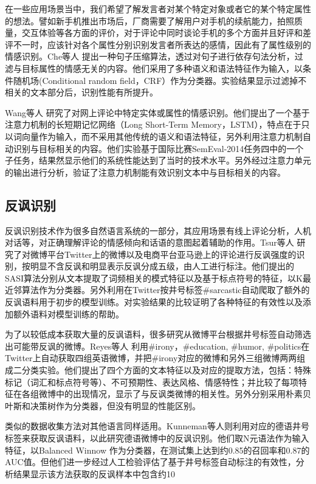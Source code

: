 在一些应用场景当中，我们希望了解发言者对某个特定对象或者它的某个特定属性的想法。譬如新手机推出市场后，厂商需要了解用户对手机的续航能力，拍照质量，交互体验等各方面的评价，对于评论中同时谈论手机的多个方面并且好评和差评不一时，应该针对各个属性分别识别发言者所表达的感情，因此有了属性级别的情感识别。Che等人 \cite{che2015sentence} 提出一种句子压缩算法，透过对句子进行依存句法分析，过滤与目标属性的情感无关的内容。他们采用了多种语义和语法特征作为输入，以条件随机场(Conditional random field，CRF）作为分类器。实验结果显示过滤掉不相关的文本部分后，识别性能有所提升。

Wang等人 \cite{wang2016attention}研究了对网上评论中特定实体或属性的情感识别。他们提出了一个基于注意力机制的长短期记忆网络（Long Short-Term Memory，LSTM），特点在于只以词向量作为输入，而不采用其他传统的语义和语法特征，另外利用注意力机制自动识别与目标相关的内容。他们实验基于国际比赛SemEval-2014任务四中的一个子任务，结果然显示他们的系统性能达到了当时的技术水平。另外经过注意力单元的输出进行分析，验证了注意力机制能有效识别文本中与目标相关的内容。

\subsection{反讽识别}

反讽识别技术作为很多自然语言系统的一部分，其应用场景有线上评论分析，人机对话等，对正确理解评论的情感倾向和话语的意图起着辅助的作用。Tsur等人 \cite{tsur2010icwsm} \cite{davidov2010semi}研究了对微博平台Twitter上的微博以及电商平台亚马逊上的评论进行反讽强度的识别，按明显不含反讽和明显表示反讽分成五级，由人工进行标注。他们提出的SASI算法分别从文本提取了词频相关的模式特征以及基于标点符号的特征，以K最近邻算法作为分类器。另外利用在Twitter按井号标签\#sarcastic自动爬取了额外的反讽语料用于初步的模型训练。对实验结果的比较证明了各种特征的有效性以及添加额外语料对模型训练的帮助。

为了以较低成本获取大量的反讽语料，很多研究从微博平台根据井号标签自动筛选出可能带反讽的微博。Reyes等人 \cite{reyes2013multidimensional} 利用\#irony，\#education, \#humor, \#politics在Twitter上自动获取四组英语微博，并把\#irony对应的微博和另外三组微博两两组成二分类实验。他们提出了四个方面的文本特征以及对应的提取方法，包括：特殊标记（词汇和标点符号等）、不可预期性、表达风格、情感特性；并比较了每项特征在各组微博中的出现情况，显示了与反讽类微博的相关性。另外分别采用朴素贝叶斯和决策树作为分类器，但没有明显的性能区别。

类似的数据收集方法对其他语言同样适用。Kunneman等人\cite{kunneman2015signaling}则利用对应的德语井号标签来获取反讽语料，以此研究德语微博中的反讽识别。他们取N元语法作为输入特征，以Balanced Winnow \cite{littlestone1988learning}作为分类器，在测试集上达到约0.85的召回率和0.87的AUC值。但他们进一步经过人工检验评估了基于井号标签自动标注的有效性，分析结果显示该方法获取的反讽样本中包含约10%

